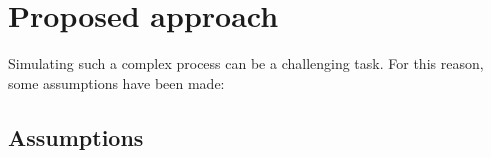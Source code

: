 \documentclass[conference]{IEEEtran}
\begin{document}


\section{Proposed approach}

    Simulating such a complex process can be a challenging task. For this reason, some assumptions have been made:

    \subsection{Assumptions}

\end{document}
